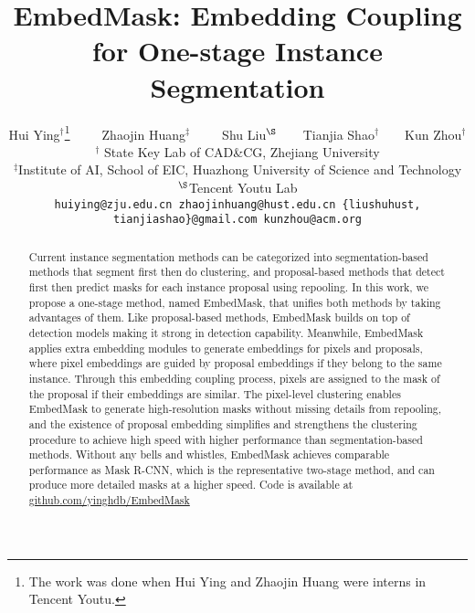 \documentclass[10pt,twocolumn,letterpaper]{article}
\begin{document}
\title{EmbedMask: Embedding Coupling for One-stage Instance Segmentation}



\author{Hui Ying$^{\dag}$\thanks{The work was done when Hui Ying and Zhaojin Huang were interns in Tencent Youtu.}\ \ \ \ \ Zhaojin Huang$^{\ddag}$\footnotemark[1]\ \ \ \ \ Shu Liu$^{\S}$\ \ \ \ Tianjia Shao$^{\dag}$\ \ \ \ Kun Zhou$^{\dag}$ \\
$^{\dag}$ State Key Lab of CAD\&CG, Zhejiang University \\ 
$^{\ddag}$Institute of AI, School of EIC, Huazhong University of Science and Technology \\
$^{\S}$Tencent Youtu Lab \\
{\tt\small huiying@zju.edu.cn zhaojinhuang@hust.edu.cn \{liushuhust, tianjiashao\}@gmail.com kunzhou@acm.org}
}

\maketitle


\begin{abstract}
Current instance segmentation methods can be categorized into segmentation-based methods that segment first then do clustering, and proposal-based methods that detect first then predict masks for each instance proposal using repooling. In this work, we propose a one-stage method, named EmbedMask, that unifies both methods by taking advantages of them. Like proposal-based methods, EmbedMask builds on top of detection models making it strong in detection capability. Meanwhile, EmbedMask applies extra embedding modules to generate embeddings for pixels and proposals, where pixel embeddings are guided by proposal embeddings if they belong to the same instance. Through this embedding coupling process, pixels are assigned to the mask of the proposal if their embeddings are similar. The pixel-level clustering enables EmbedMask to generate high-resolution masks without missing details from repooling, and the existence of proposal embedding simplifies and strengthens the clustering procedure to achieve high speed with higher performance than segmentation-based methods. Without any bells and whistles, EmbedMask achieves comparable performance as Mask R-CNN, which is the representative two-stage method, and can produce more detailed masks at a higher speed. 
Code is available at \href{https://github.com/yinghdb/EmbedMask}{github.com/yinghdb/EmbedMask}



\end{abstract}
\end{document}
